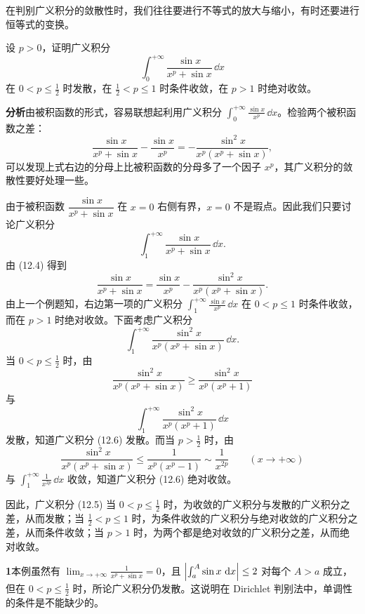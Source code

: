 在判别广义积分的敛散性时，我们往往要进行不等式的放大与缩小，有时还要进行恒等式的变换。

\begin{xexample}[12.2.4]
设 $p>0$，证明广义积分
\[
  \int_0^{+\infty}\frac{\sin x}{x^p+\sin x}\,\dd x
\]
在 $0<p\leq\frac12$ 时发散，在 $\frac12<p\leq1$ 时条件收敛，在 $p>1$ 时绝对收敛。
\end{xexample}

\textbf{分析}\quad 由被积函数的形式，容易联想起利用广义积分 $\int_0^{+\infty}\frac{\sin x}{x^p}\,\dd x$。检验两个被积函数之差：
\begin{equation}
  \frac{\sin x}{x^p+\sin x}-\frac{\sin x}{x^p}
  =-\frac{\sin^2x}{x^p(x^p+\sin x)},
  \tag{12.4}
  \label{eq:12.4}
\end{equation}
可以发现上式右边的分母上比被积函数的分母多了一个因子 $x^p$，其广义积分的敛散性要好处理一些。

\begin{xsolution}
由于被积函数 $\dfrac{\sin x}{x^p+\sin x}$ 在 $x=0$ 右侧有界，$x=0$ 不是瑕点。因此我们只要讨论广义积分
\begin{equation}
  \int_1^{+\infty}\frac{\sin x}{x^p+\sin x}\,\dd x.
  \tag{12.5}
  \label{eq:12.5}
\end{equation}
由 (12.4) 得到
\[
  \frac{\sin x}{x^p+\sin x}
  =\frac{\sin x}{x^p}-\frac{\sin^2x}{x^p(x^p+\sin x)}.
\]
由上一个例题知，右边第一项的广义积分 $\int_1^{+\infty}\frac{\sin x}{x^p}\,\dd x$ 在 $0<p\leq1$ 时条件收敛，而在 $p>1$ 时绝对收敛。下面考虑广义积分
\begin{equation}
  \int_1^{+\infty}\frac{\sin^2x}{x^p(x^p+\sin x)}\,\dd x.
  \tag{12.6}
  \label{eq:12.6}
\end{equation}
当 $0<p\leq\frac12$ 时，由
\[
  \frac{\sin^2x}{x^p(x^p+\sin x)}\geq\frac{\sin^2x}{x^p(x^p+1)}
\]
与
\[
  \int_1^{+\infty}\frac{\sin^2x}{x^p(x^p+1)}\,\dd x
\]
发散，知道广义积分 (12.6) 发散。而当 $p>\frac12$ 时，由
\[
  \frac{\sin^2x}{x^p(x^p+\sin x)}\leq\frac1{x^p(x^p-1)}\sim\frac1{x^{2p}}\qquad(x\to+\infty)
\]
与 $\int_1^{+\infty}\frac1{x^{2p}}\,\dd x$ 收敛，知道广义积分 (12.6) 绝对收敛。

因此，广义积分 (12.5) 当 $0<p\leq\frac12$ 时，为收敛的广义积分与发散的广义积分之差，从而发散；当 $\frac12<p\leq1$ 时，为条件收敛的广义积分与绝对收敛的广义积分之差，从而条件收敛；当 $p>1$ 时，为两个都是绝对收敛的广义积分之差，从而绝对收敛。
\end{xsolution}

\begin{xremark}
\textbf{1}\quad 本例虽然有 $\lim_{x\to+\infty}\frac1{x^p+\sin x}=0$，且 $\abs*{\int_a^A\sin x\,\dd x}\leq2$ 对每个 $A>a$ 成立，但在 $0<p\leq\frac12$ 时，所论广义积分仍发散。这说明在 Dirichlet 判别法中，单调性的条件是不能缺少的。
\end{xremark}


